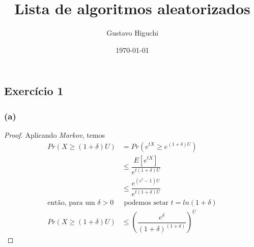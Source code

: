 \documentclass{article}
\title{Lista de algoritmos aleatorizados}
\author{Gustavo Higuchi}
\date{\today}
\begin{document}
\maketitle

\tableofcontents
\newpage


\chapter{}
\section{Exercício 1}
\subsection*{(a)}
\begin{proof}
	Aplicando \emph{Markov}, temos
	\begin{equation}
		\begin{split}
			Pr(X \geq (1 + \delta)U) &= Pr(e^{tX} \geq e^{(1+\delta)U})\\
			&\leq \dfrac{E[e^{tX}]}{e^{t(1+\delta)U}}\\
			&\leq \dfrac{e^{(e^t - 1)U}}{e^{t(1+\delta)U}}\\
			\text{então, para um }\delta > 0 & \text{ podemos setar }t = ln(1+\delta)\\
			Pr(X \geq (1 + \delta)U) &\leq \left(\dfrac{e^{\delta}}{{(1+\delta)^{(1 + \delta)}}}\right)^{U}
		\end{split}
	\end{equation}
\end{proof}
\end{document}
